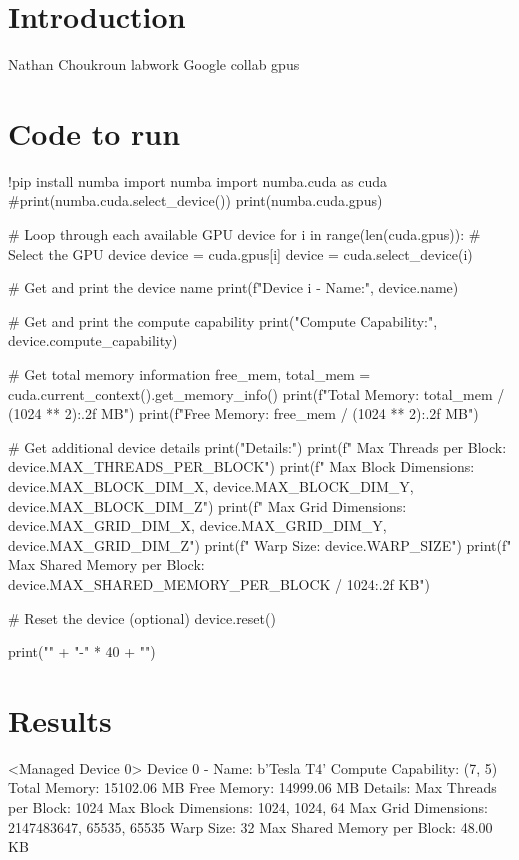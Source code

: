\documentclass{article}
\begin{document}
\section{Introduction}

Nathan Choukroun labwork
Google collab gpus

\section{Code to run}

!pip install numba
import numba
import numba.cuda as cuda
#print(numba.cuda.select_device())
print(numba.cuda.gpus)

# Loop through each available GPU device
for i in range(len(cuda.gpus)):
  # Select the GPU device
  device = cuda.gpus[i]
  device = cuda.select_device(i)

  # Get and print the device name
  print(f"Device {i} - Name:", device.name)

  # Get and print the compute capability
  print("Compute Capability:", device.compute_capability)

  # Get total memory information
  free_mem, total_mem = cuda.current_context().get_memory_info()
  print(f"Total Memory: {total_mem / (1024 ** 2):.2f} MB")
  print(f"Free Memory: {free_mem / (1024 ** 2):.2f} MB")
  
  # Get additional device details
  print("Details:")
  print(f"  Max Threads per Block: {device.MAX_THREADS_PER_BLOCK}")
  print(f"  Max Block Dimensions: {device.MAX_BLOCK_DIM_X}, {device.MAX_BLOCK_DIM_Y}, {device.MAX_BLOCK_DIM_Z}")
  print(f"  Max Grid Dimensions: {device.MAX_GRID_DIM_X}, {device.MAX_GRID_DIM_Y}, {device.MAX_GRID_DIM_Z}")
  print(f"  Warp Size: {device.WARP_SIZE}")
  print(f"  Max Shared Memory per Block: {device.MAX_SHARED_MEMORY_PER_BLOCK / 1024:.2f} KB")
  
  # Reset the device (optional)
  device.reset()

  print("\n" + "-" * 40 + "\n")

\section{Results}

<Managed Device 0>
Device 0 - Name: b'Tesla T4'
Compute Capability: (7, 5)
Total Memory: 15102.06 MB
Free Memory: 14999.06 MB
Details:
  Max Threads per Block: 1024
  Max Block Dimensions: 1024, 1024, 64
  Max Grid Dimensions: 2147483647, 65535, 65535
  Warp Size: 32
  Max Shared Memory per Block: 48.00 KB
\end{document}
